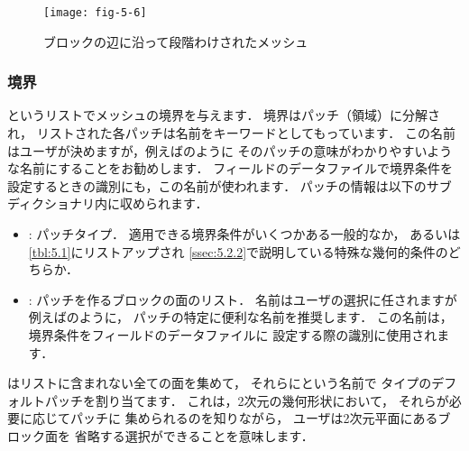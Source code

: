 \begin{figure}[ht]
 \texttt{[image: fig-5-6]}
 \caption{ブロックの辺に沿って段階わけされたメッシュ}
 \label{fig:5.6}
\end{figure}


\subsubsection{境界}
\label{sssec:5.3.1.4}
%
%
というリストでメッシュの境界を与えます．
境界はパッチ（領域）に分解され，
リストされた各パッチは名前をキーワードとしてもっています．
この名前はユーザが決めますが，例えばのように
そのパッチの意味がわかりやすいような名前にすることをお勧めします．
フィールドのデータファイルで境界条件を設定するときの識別にも，この名前が使われます．
パッチの情報は以下のサブディクショナリ内に収められます．
\begin{itemize}
 \item {}:
       パッチタイプ．
       適用できる境界条件がいくつかある一般的なか，
       あるいは\autoref{tbl:5.1}にリストアップされ
       \autoref{ssec:5.2.2}で説明している特殊な幾何的条件のどちらか．
 \item {}:
       パッチを作るブロックの面のリスト．
       名前はユーザの選択に任されますが
       例えばのように，
       パッチの特定に便利な名前を推奨します．
       この名前は，境界条件をフィールドのデータファイルに
       設定する際の識別に使用されます．
\end{itemize}
はリストに含まれない全ての面を集めて，
それらにという名前で
タイプのデフォルトパッチを割り当てます．
これは，2次元の幾何形状において，
それらが必要に応じてパッチに
集められるのを知りながら，
ユーザは2次元平面にあるブロック面を
省略する選択ができることを意味します．

